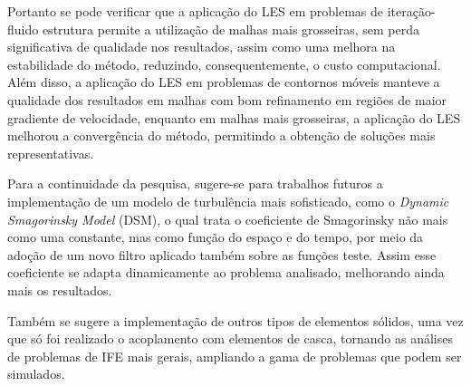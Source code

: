 Portanto se pode verificar que a aplicação do LES em problemas de iteração-fluido estrutura permite a utilização de malhas mais grosseiras, sem perda significativa de qualidade nos resultados, assim como uma melhora na estabilidade do método, reduzindo, consequentemente, o custo computacional. Além disso, a aplicação do LES em problemas de contornos móveis manteve a qualidade dos resultados em malhas com bom refinamento em regiões de maior gradiente de velocidade, enquanto em malhas mais grosseiras, a aplicação do LES melhorou a convergência do método, permitindo a obtenção de soluções mais representativas.


Para a continuidade da pesquisa, sugere-se para trabalhos futuros a implementação de um modelo de turbulência mais sofisticado, como o \textit{Dynamic Smagorinsky Model} (DSM), o qual trata o coeficiente de Smagorinsky não mais como uma constante, mas como função do espaço e do tempo, por meio da adoção de um novo filtro aplicado também sobre as funções teste. Assim esse coeficiente se adapta dinamicamente ao problema analisado, melhorando ainda mais os resultados.

Também se sugere a implementação de outros tipos de elementos sólidos, uma vez que só foi realizado o acoplamento com elementos de casca, tornando as análises de problemas de IFE mais gerais, ampliando a gama de problemas que podem ser simulados.